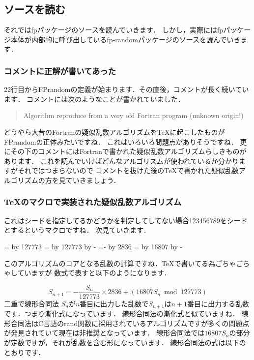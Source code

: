 \subsection{ソースを読む}
それではfpパッケージのソースを読んでいきます．
しかし，実際にはfpパッケージ本体が内部的に呼び出しているfp-randomパッケージのソースを読んでいきます．

\subsubsection{コメントに正解が書いてあった}
22行目からFPrandomの定義が始まります．その直後，コメントが長く続いています．
コメントには次のようなことが書かれていました．
\begin{quote}
Algorithm reproduce from a very old Fortran program (unknown origin!)
\end{quote}
どうやら大昔のFortranの疑似乱数アルゴリズムを\TeX に起こしたものがFPrandomの正体みたいですね．
これはいろいろ問題点がありそうですね．
更にその下のコメントにはFortranで書かれた疑似乱数アルゴリズムらしきものがあります．
これを読んでいけばどんなアルゴリズムが使われているか分かりますがそれではつまらないので
コメントを抜けた後の\TeX で書かれた疑似乱数アルゴリズムの方を見ていきましょう．

\subsubsection{\TeX のマクロで実装された疑似乱数アルゴリズム}
\begin{texcode}
\ifnum{}%
\else%
\fi%
\end{texcode}
これはシードを指定してるかどうかを判定してしてない場合123456789をシードとするというマクロですね．
次見ていきます．
\begin{texcode}
\FP@xia=\FPseed%
\divide\FP@xia by 127773%
\FP@xib=\FP@xia%
\multiply\FP@xib by 127773%
\advance\FP@xib by -\FPseed%
\FP@xib=-\FP@xib%
\multiply\FP@xia by 2836%
\FPseed=\FP@xib%
\multiply\FPseed by 16807%
\advance\FPseed by -\FP@xia%
\end{texcode}
このアルゴリズムのコアとなる乱数の計算ですね．\TeX で書いてる為ごちゃごちゃしていますが
数式で表すと以下のようになります．

\[
S_{n+1} = - \frac{S_n}{127773}\times 2836 + (16807S_n \bmod 127773)
\]
{\LARGE 二重で線形合同法}
$S_n$が$n$番目に出力した乱数で$S_{n+1}$は$n+1$番目に出力する乱数です．つまり漸化式になっています．
線形合同法の漸化式と似ていますね．
線形合同法はC言語のrand関数に採用されているアルゴリズムですが多くの問題点が発見されていて現在は非推奨となっています．
線形合同法では$16807S_n$の部分が定数ですが，それが乱数を含む形になっています．
線形合同法の式は以下のとおりです．

